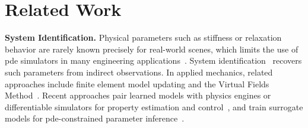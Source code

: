 \section{Related Work}
\label{sec:related_work}

\textbf{System Identification.}
Physical parameters such as stiffness or relaxation behavior are rarely known precisely for real-world scenes, which limits the use of \gls{pde} simulators in many engineering applications~\citep{landau2012theory, blazek2015computational, salatovic2025reliable, avril2017material, chai2024smart}.
System identification~\citep{aastrom1971system, lennart1999system} recovers such parameters from indirect observations.
In applied mechanics, related approaches include finite element model updating and the Virtual Fields Method~\citep{avril2008overview, pierron2010extension, bonnet2005inverse}.
Recent approaches pair learned models with physics engines or differentiable simulators for property estimation and control~\citep{wu2015galileo, murthy2020gradsim, antonova2023rethinking}, and train surrogate models for \gls{pde}-constrained parameter inference~\citep{qzhao2022graphpde, wang2024latent, adaptigraph24}.

